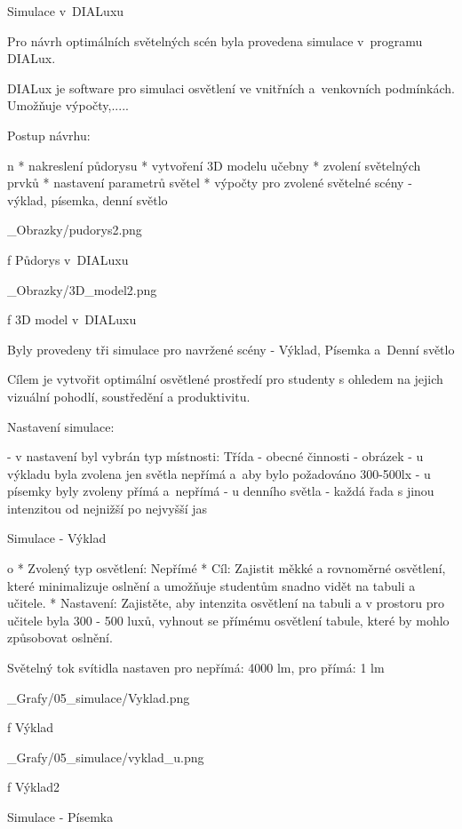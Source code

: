 \chap Simulace v~DIALuxu

Pro návrh optimálních světelných scén byla provedena simulace v~programu DIALux.

DIALux je software pro simulaci osvětlení ve vnitřních a~venkovních podmínkách. Umožňuje výpočty,.....

\medskip
Postup návrhu:

\begitems \style n
* nakreslení půdorysu
* vytvoření 3D modelu učebny
* zvolení světelných prvků
* nastavení parametrů světel
* výpočty pro zvolené světelné scény - výklad, písemka, denní světlo
\enditems
\medskip

\medskip {}
\picw=8cm _Obrazky/pudorys2.png
\caption/f Půdorys v~DIALuxu
\medskip

\medskip {}
\picw=8cm _Obrazky/3D_model2.png
\caption/f 3D model v~DIALuxu
\medskip

 

Byly provedeny tři simulace pro navržené scény - Výklad, Písemka a~Denní světlo

Cílem je vytvořit optimální osvětlené prostředí pro studenty s ohledem na jejich vizuální pohodlí, soustředění a produktivitu.

Nastavení simulace:

- v nastavení byl vybrán typ místnosti: Třída - obecné činnosti
- obrázek
- u výkladu byla zvolena jen světla nepřímá a~aby bylo požadováno 300-500lx
- u písemky byly zvoleny přímá a~nepřímá
- u denního světla - každá řada s jinou intenzitou od nejnižší po nejvyšší jas

\sec Simulace - Výklad

\begitems \style o
* Zvolený typ osvětlení: Nepřímé
* Cíl: Zajistit měkké a rovnoměrné osvětlení, které minimalizuje oslnění a umožňuje studentům snadno vidět na tabuli a učitele.
* Nastavení: Zajistěte, aby intenzita osvětlení na tabuli a v prostoru pro učitele byla 300 - 500 luxů, vyhnout se přímému osvětlení tabule, které by mohlo způsobovat oslnění.
\enditems

Světelný tok svítidla nastaven pro nepřímá: 4000 lm, pro přímá: 1 lm

\medskip {}
\picw=10cm _Grafy/05_simulace/Vyklad.png
\caption/f Výklad
\medskip

\medskip {}
\picw=10cm _Grafy/05_simulace/vyklad_u.png
\caption/f Výklad2
\medskip

\sec Simulace - Písemka

